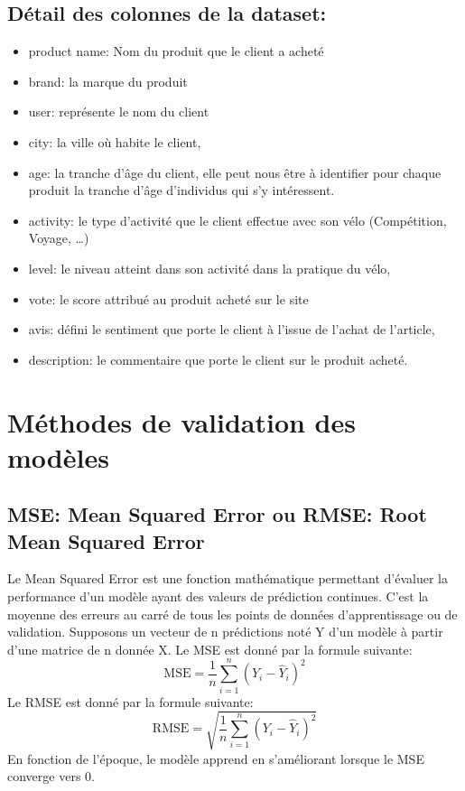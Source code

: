 \subsection{Détail des colonnes de la dataset:}
\begin{itemize}
  	\item product name: Nom du produit que le client a acheté
	\item brand: la marque du produit 
	\item user: représente le nom du client
	\item city: la ville où habite le client, 
	\item age: la tranche d'âge du client, elle peut nous être à identifier pour chaque produit la tranche d'âge d’individus qui s’y intéressent.
	\item activity: le type d’activité que le client effectue avec son vélo (Compétition, Voyage, …)
	\item level: le niveau atteint dans son activité dans la pratique du vélo,
	\item vote: le score attribué au produit acheté sur le site
	\item avis: défini le sentiment que porte le client à l’issue de l’achat de l’article,
	\item description: le commentaire que porte le client sur le produit acheté.
\end{itemize}

\newpage
\section{Méthodes de validation des modèles}
\subsection{MSE: Mean Squared Error ou RMSE: Root Mean Squared Error}
Le Mean Squared Error est une fonction mathématique permettant d’évaluer la performance d’un modèle ayant des valeurs de prédiction continues. C’est la moyenne des erreurs au carré de tous les points de données d’apprentissage ou de validation. 
Supposons un vecteur de n prédictions noté Y d’un modèle à partir d’une matrice de n donnée X.
Le MSE est donné par la formule suivante:
$$
\mathrm{MSE}=\frac{1}{n} \sum_{i=1}^n\left(Y_i-\hat{Y}_i\right)^2
$$
Le RMSE est donné par la formule suivante:
$$
\mathrm{RMSE}=\sqrt{\frac{1}{n} \sum_{i=1}^n\left(Y_i-\hat{Y}_i\right)^2}
$$
En fonction de l'époque, le modèle apprend en s’améliorant lorsque le MSE converge vers 0.

